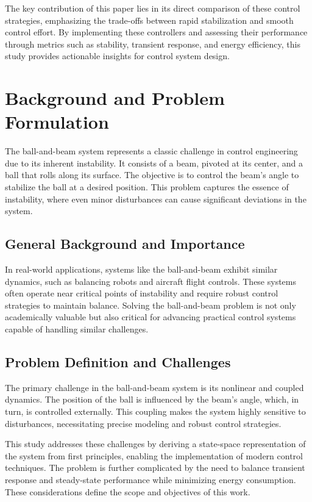 \documentclass[conference]{IEEEtran}
\begin{document}
The key contribution of this paper lies in its direct comparison of these control strategies, emphasizing the trade-offs between rapid stabilization and smooth control effort. By implementing these controllers and assessing their performance through metrics such as stability, transient response, and energy efficiency, this study provides actionable insights for control system design.

\section{Background and Problem Formulation}
\label{sec:background}
The ball-and-beam system represents a classic challenge in control engineering due to its inherent instability. It consists of a beam, pivoted at its center, and a ball that rolls along its surface. The objective is to control the beam's angle to stabilize the ball at a desired position. This problem captures the essence of instability, where even minor disturbances can cause significant deviations in the system.

\subsection{General Background and Importance}
\label{subsec:general_background}
In real-world applications, systems like the ball-and-beam exhibit similar dynamics, such as balancing robots and aircraft flight controls. These systems often operate near critical points of instability and require robust control strategies to maintain balance. Solving the ball-and-beam problem is not only academically valuable but also critical for advancing practical control systems capable of handling similar challenges.

\subsection{Problem Definition and Challenges}
\label{subsec:problem_definition}
The primary challenge in the ball-and-beam system is its nonlinear and coupled dynamics. The position of the ball is influenced by the beam's angle, which, in turn, is controlled externally. This coupling makes the system highly sensitive to disturbances, necessitating precise modeling and robust control strategies.

This study addresses these challenges by deriving a state-space representation of the system from first principles, enabling the implementation of modern control techniques. The problem is further complicated by the need to balance transient response and steady-state performance while minimizing energy consumption. These considerations define the scope and objectives of this work.
\end{document}
